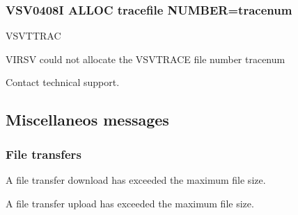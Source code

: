 \documentclass[letterpaper,10pt,english]{sphinxmanual}
\begin{document}
\subsubsection{VSV0408I ALLOC tracefile NUMBER=tracenum}
\label{\detokenize{messages:vsv0408i-alloc-tracefile-number-tracenum}}\begin{description}
\sphinxAtStartPar
VSVTTRAC

\sphinxAtStartPar
VIRSV could not allocate the VSVTRACE file number tracenum

\sphinxAtStartPar
Contact technical support.

\end{description}


\subsection{Miscellaneos messages}
\label{\detokenize{messages:miscellaneos-messages}}

\subsubsection{File transfers}
\label{\detokenize{messages:file-transfers}}
\sphinxAtStartPar
{}
\begin{description}
\sphinxAtStartPar
A file transfer download has exceeded the maximum file size.

\end{description}

\sphinxAtStartPar
{}
\begin{description}
\sphinxAtStartPar
A file transfer upload has exceeded the maximum file size.

\end{description}



\renewcommand{\indexname}{Index}
\printindex
\end{document}
